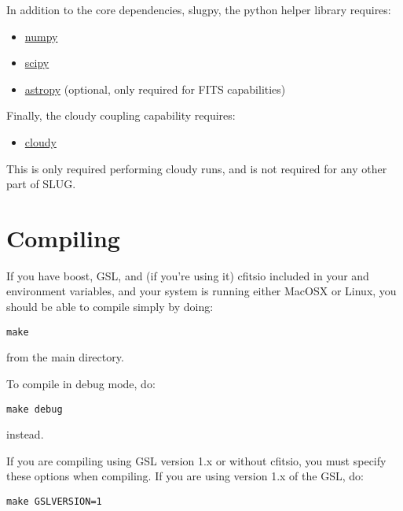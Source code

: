 \documentclass[letterpaper,10pt,english]{sphinxmanual}
\begin{document}
In addition to the core dependencies, slugpy, the python helper library requires:
\begin{itemize}
\item {} 
\href{http://www.numpy.org/}{numpy}

\item {} 
\href{http://www.scipy.org/}{scipy}

\item {} 
\href{http://www.astropy.org/}{astropy} (optional, only required for FITS capabilities)

\end{itemize}

Finally, the cloudy coupling capability requires:
\begin{itemize}
\item {} 
\href{http://nublado.org}{cloudy}

\end{itemize}

This is only required performing cloudy runs, and is not required for any other part of SLUG.


\section{Compiling}
\label{compiling:compiling}
If you have boost, GSL, and (if you're using it) cfitsio included in your  and  environment variables, and your system is running either MacOSX or Linux, you should be able to compile simply by doing:

\begin{Verbatim}[commandchars=\\\{\}]
make
\end{Verbatim}

from the main  directory.

To compile in debug mode, do:

\begin{Verbatim}[commandchars=\\\{\}]
make debug
\end{Verbatim}

instead.

If you are compiling using GSL version 1.x or without cfitsio, you must specify these options when compiling. If you are using version 1.x of the GSL, do:

\begin{Verbatim}[commandchars=\\\{\}]
make GSLVERSION=1
\end{Verbatim}
\end{document}

